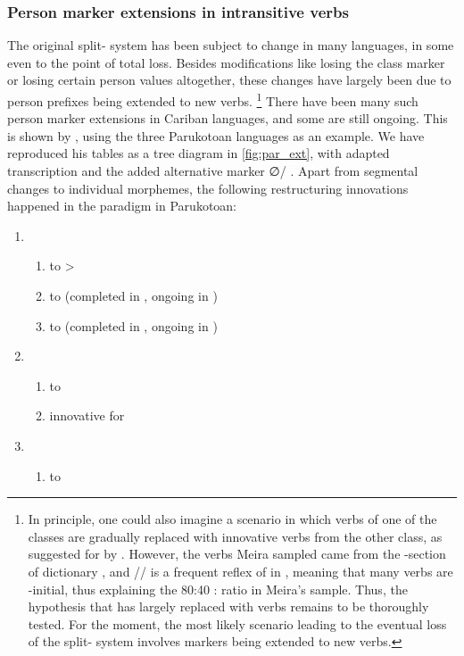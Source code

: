 \subsubsection{Person marker extensions in intransitive verbs}
\label{sec:extensions_intro}
The original \PC split- system has been subject to change in many languages, in some even to the point of total loss.
Besides modifications like losing the  class marker   or losing certain person values altogether, these changes have largely been due to person prefixes being extended to new verbs.%
\footnote{
In principle, one could also imagine a scenario in which verbs of one of the classes are gradually replaced with innovative verbs from the other class, as suggested for \panare by \textcite[225]{meira2000split}.
However, the verbs Meira sampled came from the -section of  dictionary , and \slash{}\slash{} is a frequent reflex of \detrz in \panare, meaning that many  verbs are -initial, thus explaining the 80:40 : ratio in Meira's sample.
Thus, the hypothesis that \panare has largely replaced  with  verbs remains to be thoroughly tested.
For the moment, the most likely scenario leading to the eventual loss of the split- system involves markers being extended to new verbs.}
There have been many such person marker extensions in Cariban languages, and some are still ongoing.
This is shown by \textcite{gildea1998}, using the three Parukotoan languages as an example.
We have reproduced his tables as a tree diagram in \cref{fig:par_ext}, with adapted transcription and the added \kaxui alternative  marker ∅/ .
Apart from segmental changes to individual morphemes, the following restructuring innovations happened in the \setone paradigm in Parukotoan:

\begin{enumerate}
	\item \PPar \begin{enumerate}
		\item {}  to >
		\item {}  to  (completed in \PWai, ongoing in \kaxui)
		\item {}  to  (completed in \PWai, ongoing in \kaxui)
	\end{enumerate}
	\item \PWai \begin{enumerate}
		\item {}  to 
		\item innovative   for 
	\end{enumerate}
	\item \waiwai \begin{enumerate}
		\item {}  to \end{enumerate}
\end{enumerate}

